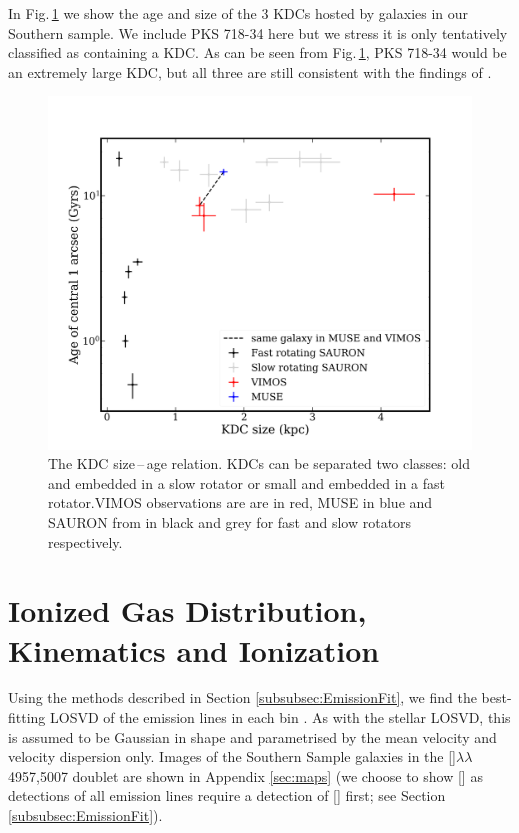 \documentclass[a4paper,fleqn,usenatbib]{mnras}
\begin{document}
		In Fig.\,\ref{fig:KDC} we show the age and size of the 3 KDCs hosted by galaxies in our Southern sample. We include PKS 718-34 here but we stress it is only tentatively classified as containing a KDC. As can be seen from Fig.\,\ref{fig:KDC}, PKS 718-34 would be an extremely large KDC, but all three are still consistent with the findings of \citet{Kuntschner2010}.

		\begin{figure}
			\includegraphics[width=\columnwidth]{KDC_size_age.png}
			\caption[KDC dichotomy]{The KDC size\,--\,age relation. KDCs can be separated two classes: old and embedded in a slow rotator or small and embedded in a fast rotator.VIMOS observations are are in red, MUSE in blue and SAURON from \citet{Kuntschner2010} in black and grey for fast and slow rotators respectively.}
			\label{fig:KDC}
		\end{figure}

\section{Ionized Gas Distribution, Kinematics and Ionization}
	\label{sec:gas}
	Using the methods described in Section \ref{subsubsec:EmissionFit}, we find the best-fitting LOSVD of the emission lines in each bin . As with the stellar LOSVD, this is assumed to be Gaussian in shape and parametrised by the mean velocity and velocity dispersion only. Images of the Southern Sample galaxies in the []$\lambda\lambda$4957,5007 doublet are shown in Appendix \ref{sec:maps} (we choose to show [] as detections of all emission lines require a detection of [] first; see Section \ref{subsubsec:EmissionFit}). 
\end{document}
